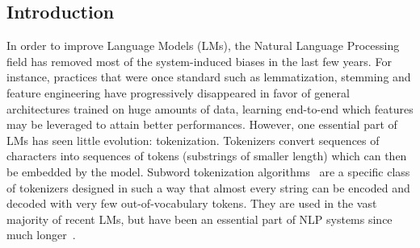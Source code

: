 \newcommand{\rs}{$\!${\color{red}|}$\!$} %
\newcommand{\nors}{$\!${\color{white}|}$\!$} %
\subsection{Introduction}
In order to improve Language Models (LMs), the Natural Language Processing field has removed most of the system-induced biases in the last few years. For instance, practices that were once standard such as lemmatization, stemming and feature engineering have progressively disappeared in favor of general architectures trained on huge amounts of data, learning end-to-end which features may be leveraged to attain better performances. However, one essential part of LMs has seen little evolution: tokenization. Tokenizers convert sequences of characters into sequences of tokens (substrings of smaller length) which can then be embedded by the model. Subword tokenization algorithms~\cite{sennrich-etal-2016-neural,wu2016google,kudo-2018-subword} are a specific class of tokenizers designed in such a way that almost every string can be encoded and decoded with very few out-of-vocabulary tokens. They are used in the vast majority of recent LMs, but have been an essential part of NLP systems since much longer~\cite{mielke2021between}.


